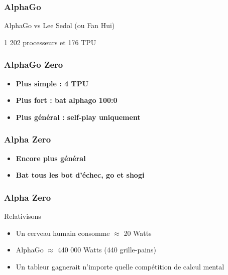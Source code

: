\documentclass{formation}
\begin{document}
\begin{frame}
  \frametitle{AlphaGo}
  \begin{center}
    AlphaGo vs Lee Sedol (ou Fan Hui)
  \end{center}
  \huge
  1 202 processeurs et 176 TPU
\end{frame}

\begin{frame}
  \frametitle{AlphaGo Zero}
  \begin{itemize}
  \item \textbf{Plus simple : 4 TPU}
  \item \textbf{Plus fort : bat alphago 100:0}
  \item \textbf{Plus général : self-play uniquement}
  \end{itemize}  
\end{frame}

\begin{frame}
  \frametitle{Alpha Zero}
  \begin{itemize}
  \item \textbf{Encore plus général}
  \item \textbf{Bat tous les bot d'échec, go et shogi}
  \end{itemize}  
\end{frame}

\begin{frame}
  \frametitle{Alpha Zero}
  Relativisons
  \begin{itemize}
  \item Un cerveau humain consomme $\approx$ 20 Watts
  \item AlphaGo $\approx$ 440 000 Watts (440 grille-pains)
  \item Un tableur gagnerait n'importe quelle compétition de calcul mental
  \end{itemize}
\end{frame}
\end{document}
